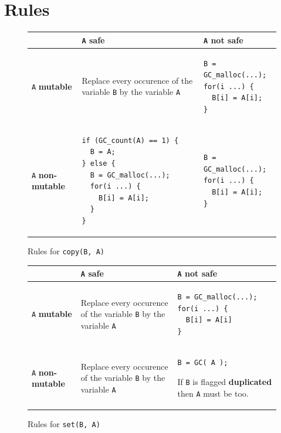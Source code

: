 \documentclass[12pt,a4paper,titlepage]{article}
\newcommand{\cl}[1]{\texttt{#1}}
\newcommand{\mut}{  \textbf{ mutable } }
\newcommand{\nmut}{ \textbf{ non-mutable } }
\newcommand{\safe}{ \textbf{ safe } }
\newcommand{\dupl}{ \textbf{ duplicated } }
\begin{document}
\newpage
\section{Rules}
\label{Rules}


\begin{figure}[!ht]
\begin{tabular}{|p{5.5cm}|p{5.5cm}|p{6cm}|}
\hline
             & \cl{A} \safe & \cl{A} not \safe \\ \hline
\cl{A} \mut  & Replace every occurence of the variable \cl{B} by the variable \cl{A} & \begin{lstlisting}
B = GC_malloc(...);
for(i ...) {
  B[i] = A[i];
}
\end{lstlisting} \\ \hline
\cl{A} \nmut & \begin{lstlisting}
if (GC_count(A) == 1) {
  B = A;
} else {
  B = GC_malloc(...);
  for(i ...) {
    B[i] = A[i];
  }
}
\end{lstlisting} & \begin{lstlisting}
B = GC_malloc(...);
for(i ...) {
  B[i] = A[i];
}
\end{lstlisting} \\ \hline
\end{tabular}
\caption{Rules for \cl{copy(B, A)}}
\end{figure}



\begin{figure}[!ht]
\begin{tabular}{|p{5.5cm}|p{5.5cm}|p{6cm}|}
\hline
             & \cl{A} \safe & \cl{A} not \safe \\ \hline
\cl{A} \mut  & Replace every occurence of the variable \cl{B} by the variable \cl{A} & \begin{lstlisting}
B = GC_malloc(...);
for(i ...) {
  B[i] = A[i]
}
\end{lstlisting} \\ \hline
\cl{A} \nmut & Replace every occurence of the variable \cl{B} by the variable \cl{A} & \begin{lstlisting}
B = GC( A );
\end{lstlisting}
If \cl{B} is flagged \dupl then \cl{A} must be too.
\\ \hline
\end{tabular}
\caption{Rules for \cl{set(B, A)}}
\end{figure}
\end{document}
